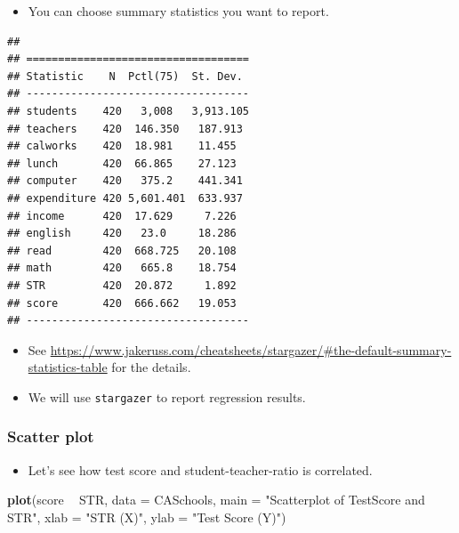 \documentclass[]{book}
\newenvironment{Shaded}{\begin{snugshade}}{\end{snugshade}}
\newcommand{\KeywordTok}[1]{\textcolor[rgb]{0.13,0.29,0.53}{\textbf{#1}}}
\newcommand{\DataTypeTok}[1]{\textcolor[rgb]{0.13,0.29,0.53}{#1}}
\newcommand{\StringTok}[1]{\textcolor[rgb]{0.31,0.60,0.02}{#1}}
\newcommand{\OperatorTok}[1]{\textcolor[rgb]{0.81,0.36,0.00}{\textbf{#1}}}
\newcommand{\NormalTok}[1]{#1}
\providecommand{\tightlist}{%
  \setlength{\itemsep}{0pt}\setlength{\parskip}{0pt}}
\begin{document}
\begin{itemize}
\tightlist
\item
  You can choose summary statistics you want to report.
\end{itemize}

\begin{Shaded}
\end{Shaded}

\begin{verbatim}
## 
## ===================================
## Statistic    N  Pctl(75)  St. Dev. 
## -----------------------------------
## students    420   3,008   3,913.105
## teachers    420  146.350   187.913 
## calworks    420  18.981    11.455  
## lunch       420  66.865    27.123  
## computer    420   375.2    441.341 
## expenditure 420 5,601.401  633.937 
## income      420  17.629     7.226  
## english     420   23.0     18.286  
## read        420  668.725   20.108  
## math        420   665.8    18.754  
## STR         420  20.872     1.892  
## score       420  666.662   19.053  
## -----------------------------------
\end{verbatim}

\begin{itemize}
\tightlist
\item
  See
  \url{https://www.jakeruss.com/cheatsheets/stargazer/\#the-default-summary-statistics-table}
  for the details.
\item
  We will use \texttt{stargazer} to report regression results.
\end{itemize}

\subsubsection{Scatter plot}\label{scatter-plot}

\begin{itemize}
\tightlist
\item
  Let's see how test score and student-teacher-ratio is correlated.
\end{itemize}

\begin{Shaded}
\begin{Highlighting}[]
\KeywordTok{plot}\NormalTok{(score }\OperatorTok{~}\StringTok{ }\NormalTok{STR, }
     \DataTypeTok{data =}\NormalTok{ CASchools,}
     \DataTypeTok{main =} \StringTok{"Scatterplot of TestScore and STR"}\NormalTok{, }
     \DataTypeTok{xlab =} \StringTok{"STR (X)"}\NormalTok{,}
     \DataTypeTok{ylab =} \StringTok{"Test Score (Y)"}\NormalTok{)}
\end{Highlighting}
\end{Shaded}
\end{document}
